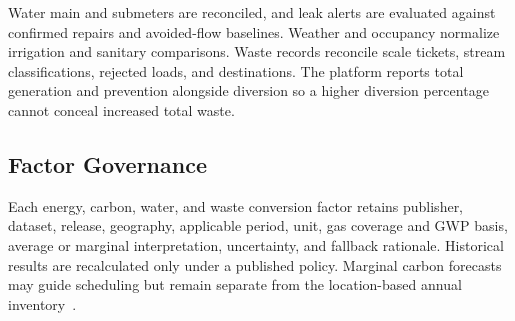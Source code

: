 Water main and submeters are reconciled, and leak alerts are evaluated against confirmed repairs and avoided-flow baselines. Weather and occupancy normalize irrigation and sanitary comparisons. Waste records reconcile scale tickets, stream classifications, rejected loads, and destinations. The platform reports total generation and prevention alongside diversion so a higher diversion percentage cannot conceal increased total waste.

\subsection{Factor Governance}

Each energy, carbon, water, and waste conversion factor retains publisher, dataset, release, geography, applicable period, unit, gas coverage and GWP basis, average or marginal interpretation, uncertainty, and fallback rationale. Historical results are recalculated only under a published policy. Marginal carbon forecasts may guide scheduling but remain separate from the location-based annual inventory~\cite{hawkes2010marginal,ghg_scope2}.
